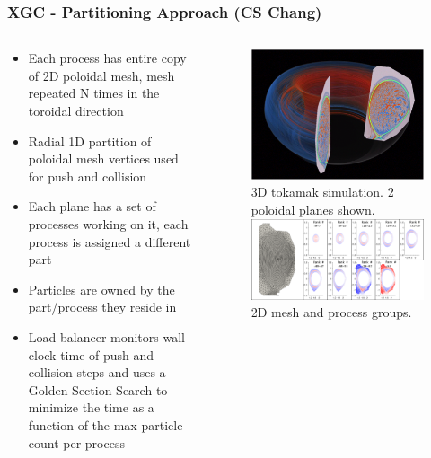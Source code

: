 \documentclass[aspectratio=169]{beamer}
\begin{document}
\begin{frame}
  \frametitle{XGC - Partitioning Approach (CS Chang)}
  \begin{columns}
    \begin{column}{0.5\textwidth}
      \begin{itemize}
        \item Each process has entire copy of 2D poloidal mesh, mesh repeated N
          times in the toroidal direction
        \item Radial 1D partition of poloidal mesh vertices used for push and collision
        \item Each plane has a set of processes working on it, each process is
          assigned a different part
        \item Particles are owned by the part/process they reside in
        \item Load balancer monitors wall clock time of push and collision steps
          and uses a Golden Section Search to minimize the time as a function of
          the max particle count per process
      \end{itemize}
    \end{column}
    \begin{column}{0.5\textwidth}
      \begin{figure}
        \centering
        \includegraphics[width=.5\textwidth]{figures/xgcTokamakSimulation.png} \\
        \small{3D tokamak simulation.  2 poloidal planes shown.}
        \includegraphics[width=.85\textwidth]{figures/xgcMeshDistribution.png} \\
        \small{2D mesh and process groups.}
      \end{figure}
    \end{column}
  \end{columns}
\end{frame}
\end{document}
